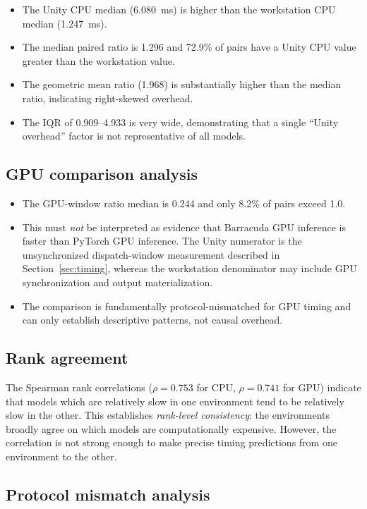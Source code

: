 \documentclass[10pt,twocolumn,letterpaper]{article}
\begin{document}
\begin{itemize}[nosep,leftmargin=*]
  \item The Unity CPU median (6.080~ms) is higher than the workstation CPU median (1.247~ms).
  \item The median paired ratio is 1.296 and 72.9\% of pairs have a Unity CPU value greater than the workstation value.
  \item The geometric mean ratio (1.968) is substantially higher than the median ratio, indicating right-skewed overhead.
  \item The IQR of 0.909--4.933 is very wide, demonstrating that a single ``Unity overhead'' factor is not representative of all models.
\end{itemize}

\subsection{GPU comparison analysis}

\begin{itemize}[nosep,leftmargin=*]
  \item The GPU-window ratio median is 0.244 and only 8.2\% of pairs exceed 1.0.
  \item This must \emph{not} be interpreted as evidence that Barracuda GPU inference is faster than PyTorch GPU inference. The Unity numerator is the unsynchronized dispatch-window measurement described in Section~\ref{sec:timing}, whereas the workstation denominator may include GPU synchronization and output materialization.
  \item The comparison is fundamentally protocol-mismatched for GPU timing and can only establish descriptive patterns, not causal overhead.
\end{itemize}

\subsection{Rank agreement}

The Spearman rank correlations ($\rho = 0.753$ for CPU, $\rho = 0.741$ for GPU) indicate that models which are relatively slow in one environment tend to be relatively slow in the other. This establishes \emph{rank-level consistency}: the environments broadly agree on which models are computationally expensive. However, the correlation is not strong enough to make precise timing predictions from one environment to the other.

\subsection{Protocol mismatch analysis}
\end{document}
